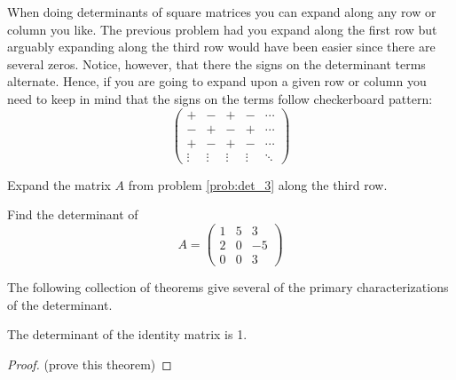 When doing determinants of square matrices you can expand along any row or column you
like.  The previous problem had you expand along the first row but arguably expanding
along the third row would have been easier since there are several zeros.  Notice,
however, that there the signs on the determinant terms alternate.  Hence, if you are going
to expand upon a given row or column you need to keep in mind that the signs on the terms
follow  checkerboard pattern:
\[ \begin{pmatrix} + & - & + & - & \cdots \\
        - & + & - & + & \cdots \\
        + & - & + & - & \cdots \\
    \vdots & \vdots & \vdots & \vdots & \ddots \end{pmatrix} \]

\begin{problem}
    Expand the matrix $A$ from problem \ref{prob:det_3} along the third row.
\end{problem}

\begin{problem}
    Find the determinant of
    \[ A = \begin{pmatrix} 1 & 5 & 3 \\ 2 & 0 & -5 \\ 0 & 0 & 3 \end{pmatrix} \]
\end{problem}
%             



The following collection of theorems give several of the primary characterizations of the
determinant.

\begin{thm}
    The determinant of the identity matrix is 1.
\end{thm}
\begin{proof}
    (prove this theorem)
\end{proof}

